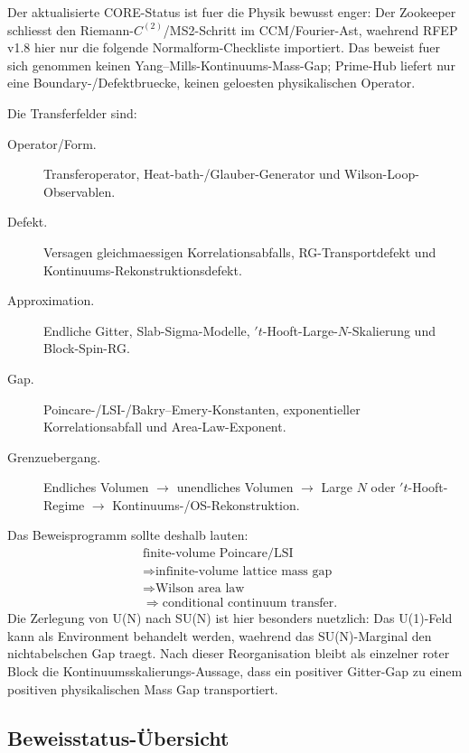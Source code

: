 \documentclass[12pt,a4paper]{article}
\theoremstyle{definition}
\theoremstyle{plain}
\theoremstyle{remark}
\begin{document}
Der aktualisierte CORE-Status ist fuer die Physik bewusst enger: Der
Zookeeper schliesst den Riemann-$C^{(2)}$/MS2-Schritt im CCM/Fourier-Ast,
waehrend RFEP v1.8 hier nur die folgende Normalform-Checkliste importiert.
Das beweist fuer sich genommen keinen Yang--Mills-Kontinuums-Mass-Gap;
Prime-Hub liefert nur eine Boundary-/Defektbruecke, keinen geloesten
physikalischen Operator.

Die Transferfelder sind:
\begin{description}
  \item[Operator/Form.] Transferoperator, Heat-bath-/Glauber-Generator und
  Wilson-Loop-Observablen.
  \item[Defekt.] Versagen gleichmaessigen Korrelationsabfalls,
  RG-Transportdefekt und Kontinuums-Rekonstruktionsdefekt.
  \item[Approximation.] Endliche Gitter, Slab-Sigma-Modelle,
  $'t$-Hooft-Large-$N$-Skalierung und Block-Spin-RG.
  \item[Gap.] Poincare-/LSI-/Bakry--Emery-Konstanten, exponentieller
  Korrelationsabfall und Area-Law-Exponent.
  \item[Grenzuebergang.] Endliches Volumen $\to$ unendliches Volumen
  $\to$ Large $N$ oder $'t$-Hooft-Regime $\to$
  Kontinuums-/OS-Rekonstruktion.
\end{description}

Das Beweisprogramm sollte deshalb lauten:
\begin{align*}
  &\text{finite-volume Poincare/LSI}\\
  &\Longrightarrow \text{infinite-volume lattice mass gap}\\
  &\Longrightarrow \text{Wilson area law}\\
  &\Longrightarrow \text{conditional continuum transfer}.
\end{align*}
Die Zerlegung von U(N) nach SU(N) ist hier besonders nuetzlich: Das
U(1)-Feld kann als Environment behandelt werden, waehrend das
SU(N)-Marginal den nichtabelschen Gap traegt.  Nach dieser Reorganisation
bleibt als einzelner roter Block die Kontinuumsskalierungs-Aussage, dass
ein positiver Gitter-Gap zu einem positiven physikalischen Mass Gap
transportiert.

\subsection*{Beweisstatus-\"Ubersicht}
\end{document}

